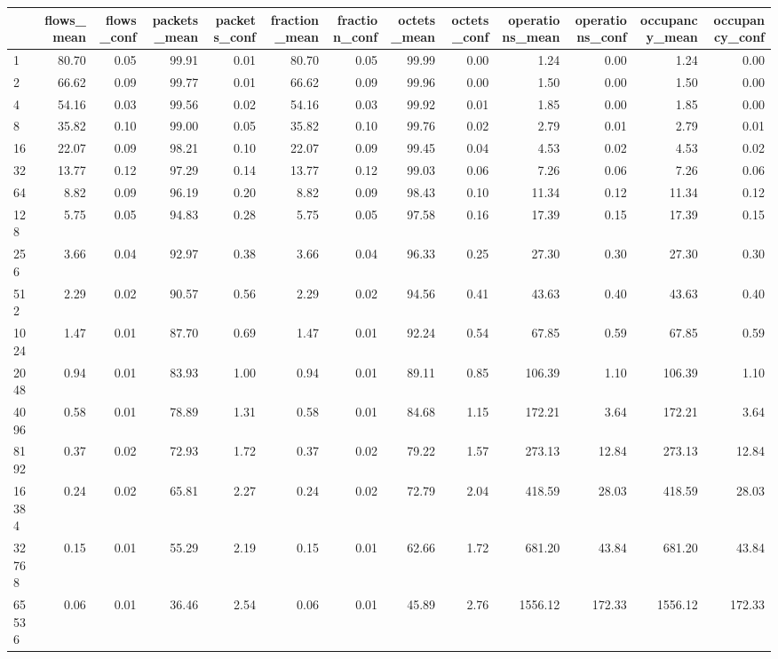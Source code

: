 \begin{tabular}{lrrrrrrrrrrrr}
\toprule
 & flows_mean & flows_conf & packets_mean & packets_conf & fraction_mean & fraction_conf & octets_mean & octets_conf & operations_mean & operations_conf & occupancy_mean & occupancy_conf \\
\midrule
1 & 80.70 & 0.05 & 99.91 & 0.01 & 80.70 & 0.05 & 99.99 & 0.00 & 1.24 & 0.00 & 1.24 & 0.00 \\
2 & 66.62 & 0.09 & 99.77 & 0.01 & 66.62 & 0.09 & 99.96 & 0.00 & 1.50 & 0.00 & 1.50 & 0.00 \\
4 & 54.16 & 0.03 & 99.56 & 0.02 & 54.16 & 0.03 & 99.92 & 0.01 & 1.85 & 0.00 & 1.85 & 0.00 \\
8 & 35.82 & 0.10 & 99.00 & 0.05 & 35.82 & 0.10 & 99.76 & 0.02 & 2.79 & 0.01 & 2.79 & 0.01 \\
16 & 22.07 & 0.09 & 98.21 & 0.10 & 22.07 & 0.09 & 99.45 & 0.04 & 4.53 & 0.02 & 4.53 & 0.02 \\
32 & 13.77 & 0.12 & 97.29 & 0.14 & 13.77 & 0.12 & 99.03 & 0.06 & 7.26 & 0.06 & 7.26 & 0.06 \\
64 & 8.82 & 0.09 & 96.19 & 0.20 & 8.82 & 0.09 & 98.43 & 0.10 & 11.34 & 0.12 & 11.34 & 0.12 \\
128 & 5.75 & 0.05 & 94.83 & 0.28 & 5.75 & 0.05 & 97.58 & 0.16 & 17.39 & 0.15 & 17.39 & 0.15 \\
256 & 3.66 & 0.04 & 92.97 & 0.38 & 3.66 & 0.04 & 96.33 & 0.25 & 27.30 & 0.30 & 27.30 & 0.30 \\
512 & 2.29 & 0.02 & 90.57 & 0.56 & 2.29 & 0.02 & 94.56 & 0.41 & 43.63 & 0.40 & 43.63 & 0.40 \\
1024 & 1.47 & 0.01 & 87.70 & 0.69 & 1.47 & 0.01 & 92.24 & 0.54 & 67.85 & 0.59 & 67.85 & 0.59 \\
2048 & 0.94 & 0.01 & 83.93 & 1.00 & 0.94 & 0.01 & 89.11 & 0.85 & 106.39 & 1.10 & 106.39 & 1.10 \\
4096 & 0.58 & 0.01 & 78.89 & 1.31 & 0.58 & 0.01 & 84.68 & 1.15 & 172.21 & 3.64 & 172.21 & 3.64 \\
8192 & 0.37 & 0.02 & 72.93 & 1.72 & 0.37 & 0.02 & 79.22 & 1.57 & 273.13 & 12.84 & 273.13 & 12.84 \\
16384 & 0.24 & 0.02 & 65.81 & 2.27 & 0.24 & 0.02 & 72.79 & 2.04 & 418.59 & 28.03 & 418.59 & 28.03 \\
32768 & 0.15 & 0.01 & 55.29 & 2.19 & 0.15 & 0.01 & 62.66 & 1.72 & 681.20 & 43.84 & 681.20 & 43.84 \\
65536 & 0.06 & 0.01 & 36.46 & 2.54 & 0.06 & 0.01 & 45.89 & 2.76 & 1556.12 & 172.33 & 1556.12 & 172.33 \\

\end{tabular}
